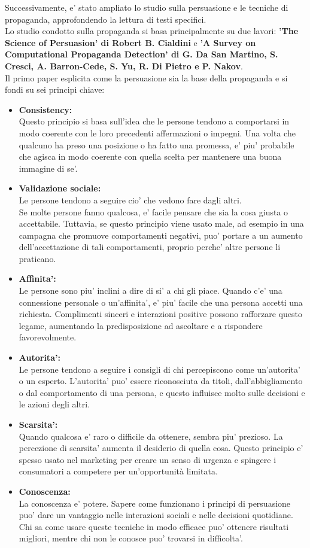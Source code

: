 \documentclass{article}
\begin{document}
Successivamente, e' stato ampliato lo studio sulla persuasione e le tecniche di propaganda, approfondendo la lettura di testi specifici.\\
Lo studio condotto sulla propaganda si basa principalmente su due lavori: \textbf{'The Science of Persuasion' di Robert B. Cialdini} e \textbf{'A Survey on Computational Propaganda Detection' di G. Da San Martino, S. Cresci, A. Barron-Cede, S. Yu, R. Di Pietro e P. Nakov}.\\
Il primo paper esplicita come la persuasione sia la base della propaganda e si fondi su sei principi chiave:
\begin{itemize}
	\item \textbf{Consistency:}\\
	Questo principio si basa sull'idea che le persone tendono a comportarsi in modo coerente con le loro precedenti affermazioni o impegni. Una volta che qualcuno ha preso una posizione o ha fatto una promessa, e' piu' probabile che agisca in modo coerente con quella scelta per mantenere una buona immagine di se'.\\
	\item \textbf{Validazione sociale:}\\
	Le persone tendono a seguire cio' che vedono fare dagli altri.\\
	Se molte persone fanno qualcosa, e' facile pensare che sia la cosa giusta o accettabile. Tuttavia, se questo principio viene usato male, ad esempio in una campagna che promuove comportamenti negativi, puo' portare a un aumento dell'accettazione di tali comportamenti, proprio perche' altre persone li praticano.
	\item \textbf{Affinita':}\\
	Le persone sono piu' inclini a dire di si' a chi gli piace. Quando c’e' una connessione personale o un’affinita', e' piu' facile che una persona accetti una richiesta. Complimenti sinceri e interazioni positive possono rafforzare questo legame, aumentando la predisposizione ad ascoltare e a rispondere favorevolmente.
	\item \textbf{Autorita':}\\
	Le persone tendono a seguire i consigli di chi percepiscono come un'autorita' o un esperto. L'autorita' puo' essere riconosciuta da titoli, dall'abbigliamento o dal comportamento di una persona, e questo influisce molto sulle decisioni e le azioni degli altri.
	\item \textbf{Scarsita':}\\
	Quando qualcosa e' raro o difficile da ottenere, sembra piu' prezioso. La percezione di scarsita' aumenta il desiderio di quella cosa. Questo principio e' spesso usato nel marketing per creare un senso di urgenza e spingere i consumatori a competere per un'opportunità limitata.
	\item \textbf{Conoscenza:}\\
	La conoscenza e' potere. Sapere come funzionano i principi di persuasione puo' dare un vantaggio nelle interazioni sociali e nelle decisioni quotidiane. Chi sa come usare queste tecniche in modo efficace puo' ottenere risultati migliori, mentre chi non le conosce puo' trovarsi in difficolta'.
\end{itemize}
\end{document}
